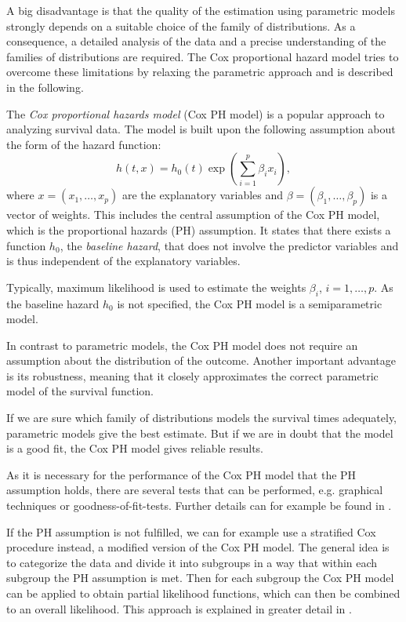 \documentclass[12pt, a4paper]{scrartcl}
\theoremstyle{definition}
\theoremstyle{plain}
\numberwithin{equation}{section}
\numberwithin{figure}{section}
\numberwithin{table}{section}
\begin{document}
	A big disadvantage is that the quality of the estimation using parametric models strongly depends on a suitable choice of the family of distributions.
	As a consequence, a detailed analysis of the data and a precise understanding of the families of distributions are required.
	The Cox proportional hazard model tries to overcome these limitations by relaxing the parametric approach and is described in the following.
	
	The \emph{Cox proportional hazards model} (Cox PH model) is a popular approach to analyzing survival data.
	The model is built upon the following assumption about the form of the hazard function:
	\begin{equation*}
	h(t,x) = h_0(t) \exp \left(\sum_{i=1}^p \beta_i x_i\right),
	\end{equation*}
	where $x=(x_1,\dots,x_p)$ are the explanatory variables and $\beta = (\beta_1,\dots, \beta_p)$ is a vector of weights.
	This includes the central assumption of the Cox PH model, which is the proportional hazards (PH) assumption.
	It states that there exists a function $h_0$, the \emph{baseline hazard}, that does not involve the predictor variables and is thus independent of the explanatory variables.

	Typically, maximum likelihood is used to estimate the weights $\beta_i$, $i=1,\dots ,p$.
	As the baseline hazard $h_0$ is not specified, the Cox PH model is a semiparametric model.
	
	In contrast to parametric models, the Cox PH model does not require an assumption about the distribution of the outcome.
	Another important advantage is its robustness, meaning that it closely approximates the correct parametric model of the survival function.
	
	If we are sure which family of distributions models the survival times adequately, parametric models give the best estimate.
	But if we are in doubt that the model is a good fit, the Cox PH model gives reliable results.
	
	As it is necessary for the performance of the Cox PH model that the PH assumption holds, there are several tests that can be performed, e.g. graphical techniques or goodness-of-fit-tests.
	Further details can for example be found in \citet*[Chapter~3]{sabook}.
	
	If the PH assumption is not fulfilled, we can for example use a stratified Cox procedure instead, a modified version of the Cox PH model.
	The general idea is to categorize the data and divide it into subgroups in a way that within each subgroup the PH assumption is met.
	Then for each subgroup the Cox PH model can be applied to obtain partial likelihood functions, which can then be combined to an overall likelihood.
	This approach is explained in greater detail in \citet*[Chapter~5]{sabook}.
	
\end{document}
